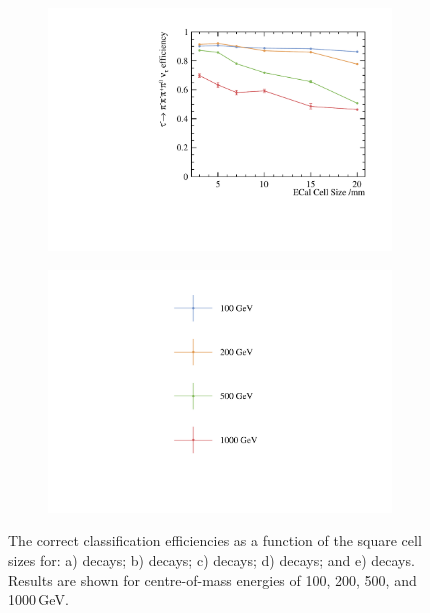 \begin{figure}[htbp]
\begin{subfigure}[b]{0.45\textwidth}
  \includegraphics[width=\textwidth]{tau/plots3/decayMode6.pdf}
  \caption{}
  \label{fig:tauDecayMode6}
\end{subfigure}
\begin{subfigure}[b]{0.45\textwidth}
  \includegraphics[width=\textwidth]{tau/plots3/legend.pdf}
  \label{fig:tauDecayLegend}
\end{subfigure}
\caption[The correct classification efficiency for  tau hadronic decay final states  as a function of the \ECAL square cell sizes]
{ The correct classification efficiencies as a function of the \ECAL square cell sizes for: a) \tauToPion decays; b) \tauToRho decays; c) \tauToAiPhoton decays; d) \tauToAiPion decays; and e) \tauToThreePion decays. Results are shown for centre-of-mass energies of 100, 200, 500, and 1000\,GeV.}
\label{fig:TauPionEfficiency}
\end{figure}



